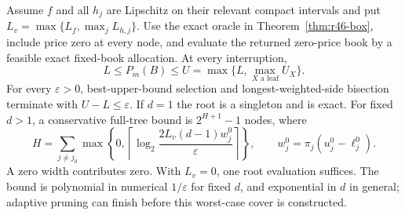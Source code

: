 \begin{theorem}\label{thm:r46-adaptive}
Assume $f$ and all $h_j$ are Lipschitz on their relevant compact intervals and put $L_v=\max\{L_f,\max_jL_{h,j}\}$. Use the exact oracle in Theorem~\ref{thm:r46-box}, include price zero at every node, and evaluate the returned zero-price book by a feasible exact fixed-book allocation. At every interruption,
\begin{equation}\label{eq:r46-interval}
 L\leq P_m(B)\leq U=\max\{L,\max_{X\text{ a leaf}}U_X\}.
\end{equation}
For every $\varepsilon>0$, best-upper-bound selection and longest-weighted-side bisection terminate with $U-L\leq\varepsilon$. If $d=1$ the root is a singleton and is exact. For fixed $d>1$, a conservative full-tree bound is $2^{H+1}-1$ nodes, where
\begin{equation}\label{eq:r46-depth}
 H=\sum_{j\ne j_0}\max\left\{0,
 \left\lceil\log_2\frac{2L_v(d-1)w_j^0}{\varepsilon}\right\rceil\right\},
 \qquad w_j^0=\pi_j(u_j^0-\ell_j^0).
\end{equation}
A zero width contributes zero. With $L_v=0$, one root evaluation suffices. The bound is polynomial in numerical $1/\varepsilon$ for fixed $d$, and exponential in $d$ in general; adaptive pruning can finish before this worst-case cover is constructed.
\end{theorem}
